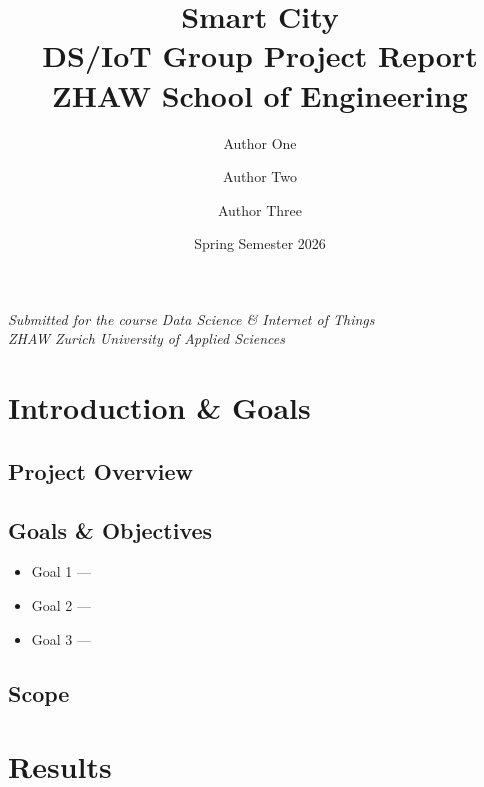 \documentclass[a4paper,12pt]{article}
\title{
    \vspace{2cm}
    \textbf{Smart City} \\[0.5em]
    \large DS/IoT Group Project Report \\[0.5em]
    \normalsize ZHAW School of Engineering
}
\author{
    Author One \and Author Two \and Author Three
}
\date{Spring Semester 2026}
\begin{document}
\maketitle
\thispagestyle{empty}
\vfill
\begin{center}
    \textit{Submitted for the course Data Science \& Internet of Things} \\
    \textit{ZHAW Zurich University of Applied Sciences}
\end{center}
\newpage

\tableofcontents
\newpage

\section{Introduction \& Goals}


\subsection{Project Overview}

\subsection{Goals \& Objectives}
\begin{itemize}
    \item Goal 1 — %
    \item Goal 2 — %
    \item Goal 3 — %
\end{itemize}

\subsection{Scope}

\section{Results}

\end{document}
